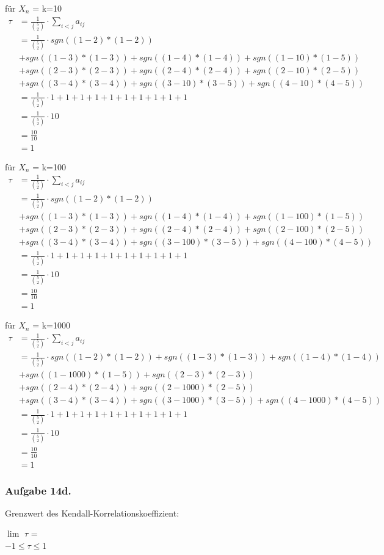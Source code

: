 \documentclass[a4paper,12pt]{article}
\newcommand{\ex}[1]{\newpage\subsubsection*{Aufgabe #1.}}
\begin{document}
	\newpage
	
	für $X_{n}$ = k=10 \\
	
	\begin{align*}
	\tau 
	&= \frac{1}{\binom{5}{2}} \cdot \sum_{i<j}^{} a_{ij} \\
	&= \frac{1}{\binom{5}{2}} \cdot sgn((1-2)*(1-2)) \\
	&+ sgn((1-3)*(1-3)) +sgn((1-4)*(1-4)) +sgn((1-10)*(1-5))\\
	& +sgn((2-3)*(2-3)) + sgn((2-4)*(2-4)) + sgn((2-10)*(2-5)) \\
	&+ sgn((3-4)*(3-4)) + sgn((3-10)*(3-5)) + sgn((4-10)*(4-5))  \\
	&= \frac{1}{\binom{5}{2}} \cdot 1 + 1 + 1 + 1 + 1 + 1 + 1 +	1 + 1 + 1 \\
	&= \frac{1}{\binom{5}{2}} \cdot 10  \\
	&= \frac{10}{10} \\
	&= 1 
	\end{align*}
	
		für $X_{n}$ = k=100 \\
	
	\begin{align*}
	\tau 
	&= \frac{1}{\binom{5}{2}} \cdot \sum_{i<j}^{} a_{ij} \\
	&= \frac{1}{\binom{5}{2}} \cdot sgn((1-2)*(1-2)) \\
	&+ sgn((1-3)*(1-3)) +sgn((1-4)*(1-4)) +sgn((1-100)*(1-5)) \\
	&+sgn((2-3)*(2-3)) + sgn((2-4)*(2-4)) + sgn((2-100)*(2-5)) \\
	&+ sgn((3-4)*(3-4)) + sgn((3-100)*(3-5)) + sgn((4-100)*(4-5))  \\
	&= \frac{1}{\binom{5}{2}} \cdot 1 + 1 + 1 + 1 + 1 + 1 + 1 +	1 + 1 + 1 \\
	&= \frac{1}{\binom{5}{2}} \cdot 10  \\
	&= \frac{10}{10} \\
	&= 1 
	\end{align*}
	\newpage
	
	für $X_{n}$ = k=1000 \\
	
	\begin{align*}
	\tau 
	&= \frac{1}{\binom{5}{2}} \cdot \sum_{i<j}^{} a_{ij} \\
	&= \frac{1}{\binom{5}{2}} \cdot sgn((1-2)*(1-2)) + sgn((1-3)*(1-3)) +sgn((1-4)*(1-4))\\  &+sgn((1-1000)*(1-5)) +sgn((2-3)*(2-3))\\
	& + sgn((2-4)*(2-4)) + sgn((2-1000)*(2-5))\\
	&+sgn((3-4)*(3-4)) + sgn((3-1000)*(3-5)) + sgn((4-1000)*(4-5))  \\
	&= \frac{1}{\binom{5}{2}} \cdot 1 + 1 + 1 + 1 + 1 + 1 + 1 +	1 + 1 + 1 \\
	&= \frac{1}{\binom{5}{2}} \cdot 10  \\
	&= \frac{10}{10} \\
	&= 1 
	\end{align*}
	
	
	\ex{14d}
	
	Grenzwert des Kendall-Korrelationskoeffizient:
	
		$\lim$ $\tau$ =   \\
		$-1 \leq \tau  \leq $1
	
	
	
	
\end{document}
